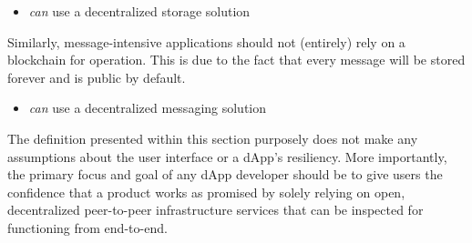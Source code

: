 \begin{description}[format={\storedescriptionlabel}]
	\begin{itemize}
		\item \textit{can} use a decentralized storage solution
	\end{itemize}
	
	Similarly, message-intensive applications should not (entirely) rely on a blockchain for operation. This is due to the fact that every message will be stored forever and is public by default. 
	
	\begin{itemize}
		\item \textit{can} use a decentralized messaging solution
	\end{itemize}
	
	
\end{description}

The definition presented within this section purposely does not make any assumptions about the user interface or a \ac{dApp}'s resiliency. More importantly, the primary focus and goal of any \ac{dApp} developer should be to give users the confidence that a product works as promised by solely relying on open, decentralized peer-to-peer infrastructure services that can be inspected for functioning from end-to-end.






%
	
